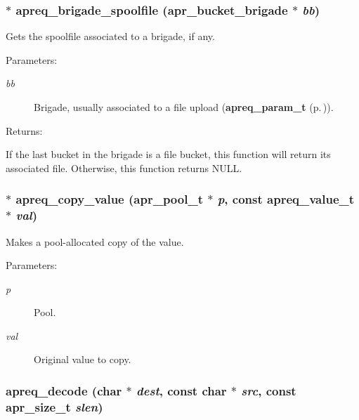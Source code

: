\subsubsection{$\ast$ apreq\_\-brigade\_\-spoolfile ({\bf apr\_\-bucket\_\-brigade} $\ast$ {\em bb})}\label{group__Utils_a21}


Gets the spoolfile associated to a brigade, if any. \begin{Desc}
\item[Parameters: ]\par
\begin{description}
\item[{\em 
bb}]Brigade, usually associated to a file upload ({\bf apreq\_\-param\_\-t} {\rm (p.\,\pageref{structapreq__param__t})}). \end{description}
\end{Desc}
\begin{Desc}
\item[Returns: ]\par
If the last bucket in the brigade is a file bucket, this function will return its associated file. Otherwise, this function returns NULL. \end{Desc}
\subsubsection{$\ast$ apreq\_\-copy\_\-value ({\bf apr\_\-pool\_\-t} $\ast$ {\em p}, const {\bf apreq\_\-value\_\-t} $\ast$ {\em val})}\label{group__Utils_a4}


Makes a pool-allocated copy of the value. \begin{Desc}
\item[Parameters: ]\par
\begin{description}
\item[{\em 
p}]Pool. \item[{\em 
val}]Original value to copy. \end{description}
\end{Desc}
\subsubsection{ apreq\_\-decode (char $\ast$ {\em dest}, const char $\ast$ {\em src}, const {\bf apr\_\-size\_\-t} {\em slen})}\label{group__Utils_a13}


